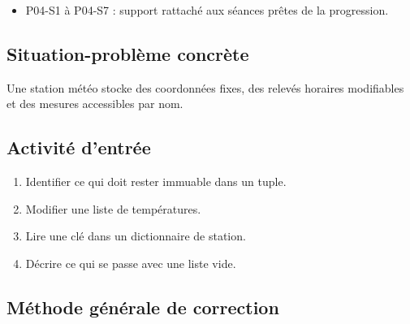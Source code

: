 \begin{itemize}
\tightlist
\item
  P04-S1 à P04-S7 : support rattaché aux séances prêtes de la
  progression.
\end{itemize}

\subsection{Situation-problème concrète}

Une station météo stocke des coordonnées fixes, des relevés horaires
modifiables et des mesures accessibles par nom.

\subsection{Activité d’entrée}

\begin{enumerate}
\def\labelenumi{\arabic{enumi}.}
\tightlist
\item
  Identifier ce qui doit rester immuable dans un tuple.
\item
  Modifier une liste de températures.
\item
  Lire une clé dans un dictionnaire de station.
\item
  Décrire ce qui se passe avec une liste vide.
\end{enumerate}

\subsection{Méthode générale de correction}


